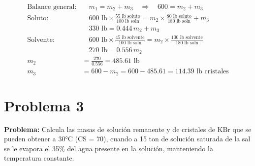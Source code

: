 \documentclass{article} %
\begin{document}
\begin{multicols}{2}
\begin{align*}
    \text{Balance general:} & \quad m_1 = m_2 + m_3 \quad \Rightarrow \quad 600 = m_2 + m_3 \\[10pt]
    \text{Soluto:} & \quad 600 \text{ lb} \times \frac{55 \text{ lb soluto}}{100 \text{ lb soln}} = m_2 \times \frac{80 \text{ lb soluto}}{180 \text{ lb soln}} + m_3 \\[10pt]
    & \quad 330 \text{ lb} = 0.444 \, m_2 + m_3 \\[10pt]
    \text{Solvente:} & \quad 600 \text{ lb} \times \frac{45 \text{ lb solvente}}{100 \text{ lb soln}} = m_2 \times \frac{100 \text{ lb solvente}}{180 \text{ lb soln}} \\[10pt]
    & \quad 270 \text{ lb} = 0.556 \, m_2 \\[10pt]
    m_2 &= \frac{270}{0.556} = 485.61 \text{ lb} \\[10pt]
    m_3 &= 600 - m_2 = 600 - 485.61 = 114.39 \text{ lb cristales}
\end{align*}
\end{multicols} %


\newpage %
\section*{Problema 3} %
\textbf{Problema:} Calcula las masas de solución remanente y de cristales de KBr que se pueden obtener a 30°C (CS = 70), cuando a 15 ton de solución saturada de la sal se le evapora el 35\% del agua presente en la solución, manteniendo la temperatura constante.
\end{document}
